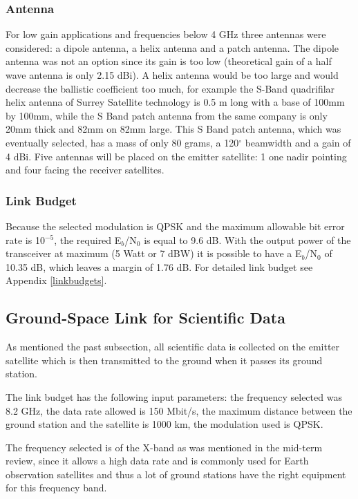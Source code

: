 \subsubsection{Antenna}
For low gain applications and frequencies below 4 GHz three antennas were considered: a dipole antenna, a helix antenna and a patch antenna. The dipole antenna was not an option since its gain is too low (theoretical gain of a half wave antenna is only 2.15 dBi). A helix antenna would be too large and would decrease the ballistic coefficient too much, for example the S-Band quadrifilar helix antenna of Surrey Satellite technology \cite{SurrHelix} is 0.5 m long with a base of 100mm by 100mm, while the S Band patch antenna \cite{SurrPatch} from the same company is only 20mm thick and 82mm on 82mm large. 
This S Band patch antenna, which was eventually selected, has a mass of only 80 grams, a 120$^{\circ}$ beamwidth and a gain of 4 dBi.
Five antennas will be placed on the emitter satellite: 1 one nadir pointing and four facing the receiver satellites.

\subsubsection{Link Budget}
Because the selected modulation is QPSK and the maximum allowable bit error rate is 10$^{-5}$, the required E$_{b}$/N$_{0}$ is equal to 9.6 dB. With the output power of the transceiver at maximum (5 Watt or 7 dBW) it is possible to have a E$_{b}$/N$_{0}$ of 10.35 dB, which leaves a margin of 1.76 dB. For detailed link budget see Appendix \ref{linkbudgets}.

\subsection{Ground-Space Link for Scientific Data}
As mentioned the past subsection, all scientific data is collected on the emitter satellite which is then transmitted to the ground when it passes its ground station.

The link budget has the following input parameters: the frequency selected was 8.2 GHz, the data rate allowed is 150 Mbit/s, the maximum distance between the ground station and the satellite is 1000 km, the modulation used is QPSK.

The frequency selected is of the X-band as was mentioned in the mid-term review, since it allows a high data rate and is commonly used for Earth observation satellites and thus a lot of ground stations have the right equipment for this frequency band.

